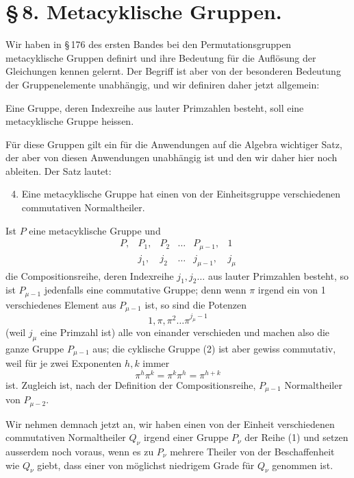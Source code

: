 \documentclass[11pt]{article}
\begin{document}
\section*{\S\,8. Metacyklische Gruppen.}

Wir haben in \S\,176 des ersten Bandes bei den Permutationsgruppen metacyklische Gruppen definirt und ihre Bedeutung für die Auflösung der Gleichungen kennen gelernt. Der Begriff ist aber von der besonderen Bedeutung der Gruppenelemente unabhängig, und wir definiren daher jetzt allgemein:

Eine Gruppe, deren Indexreihe aus lauter Primzahlen besteht, soll eine metacyklische Gruppe heissen.

Für diese Gruppen gilt ein für die Anwendungen auf die Algebra wichtiger Satz, der aber von diesen Anwendungen unabhängig ist und den wir daher hier noch ableiten. Der Satz lautet:
\begin{enumerate}[label=\Roman*.]
\setcounter{enumi}{3}
\item Eine metacyklische Gruppe hat einen von der Einheitsgruppe verschiedenen commutativen Normaltheiler.
\end{enumerate}

Ist $P$ eine metacyklische Gruppe und
\begin{equation}
\begin{array}{cccccc}
P,&P_1,&P_2&\ldots&P_{\mu-1},&1\\
&j_1,&j_2&\ldots&j_{\mu-1},&j_\mu
\end{array}
\tag{1}
\end{equation}
die Compositionsreihe, deren Indexreihe $j_1,j_2\ldots$ aus lauter Primzahlen besteht, so ist $P_{\mu-1}$ jedenfalls eine commutative Gruppe; denn wenn $\pi$ irgend ein von 1 verschiedenes Element aus $P_{\mu-1}$ ist, so sind die Potenzen
\begin{equation}
1,\pi,\pi^2\ldots \pi^{j_\mu-1}
\tag{2}
\end{equation}
(weil $j_\mu$ eine Primzahl ist) alle von einander verschieden und machen also die ganze Gruppe $P_{\mu-1}$ aus; die cyklische Gruppe (2) ist aber gewiss commutativ, weil für je zwei Exponenten $h,k$ immer
\[
\pi^h\pi^k=\pi^k\pi^h=\pi^{h+k}
\]
ist. Zugleich ist, nach der Definition der Compositionsreihe, $P_{\mu-1}$ Normaltheiler von $P_{\mu-2}$.

Wir nehmen demnach jetzt an, wir haben einen von der Einheit verschiedenen commutativen Normaltheiler $Q_\nu$ irgend einer Gruppe $P_\nu$ der Reihe (1) und setzen ausserdem noch voraus, wenn es zu $P_\nu$ mehrere Theiler von der Beschaffenheit wie $Q_\nu$ giebt, dass einer von möglichst niedrigem Grade für $Q_\nu$ genommen ist.
\end{document}
